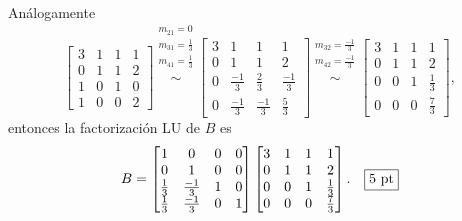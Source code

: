 \documentclass[11pt]{article}
\begin{document}
\begin{enumerate}
\begin{enumerate}
An\'alogamente
$$
\begin{bmatrix}
3 & 1 & 1 & 1 \\
0 & 1 & 1 & 2 \\
1 & 0 & 1 & 0 \\
1 & 0 & 0 & 2
\end{bmatrix}
   	\stackrel{\begin{array}{c}
     m_{21}=0 \\
     m_{31}=\frac{1}{3} \\
     m_{41}=\frac{1}{3} \\
     			\end{array}
     			}{\sim}
                \begin{bmatrix}
                3 & 1 & 1 & 1 \\
                0 & 1 & 1 & 2 \\
                0 & \frac{-1}{3} & \frac{2}{3} & \frac{-1}{3}\\
                0 & \frac{-1}{3} & \frac{-1}{3} & \frac{5}{3}
                \end{bmatrix}
     \stackrel{\begin{array}{c}
     m_{32}=\frac{-1}{3} \\
     m_{42}=\frac{-1}{3} \\
     			\end{array}
     			}{\sim}
                \begin{bmatrix}
                3 & 1 & 1 & 1 \\
                0 & 1 & 1 & 2 \\
                0 & 0 & 1 & \frac{1}{3}\\
                0 & 0 & 0 & \frac{7}{3}
                \end{bmatrix},
$$
entonces la factorizaci\'on LU de $B$ es
$$
B=
\begin{bmatrix}
1 & 0 & 0 & 0 \\
0 & 1 & 0 & 0\\
\frac{1}{3}	 & \frac{-1}{3} & 1 & 0 \\
\frac{1}{3} & \frac{-1}{3} & 0 & 1
\end{bmatrix}              
              \begin{bmatrix}
                3 & 1 & 1 & 1 \\
                0 & 1 & 1 & 2 \\
                0 & 0 & 1 & \frac{1}{3}\\
                0 & 0 & 0 & \frac{7}{3}
                \end{bmatrix}. \quad \fbox{5 pt}
$$



\end{enumerate}
\end{enumerate}
\end{document}
